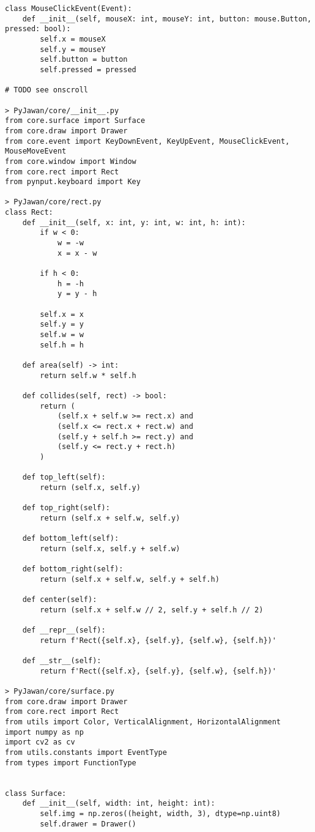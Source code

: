 \documentclass[11pt]{article}
\begin{document}
\begin{lstlisting}
class MouseClickEvent(Event):
    def __init__(self, mouseX: int, mouseY: int, button: mouse.Button, pressed: bool):
        self.x = mouseX
        self.y = mouseY
        self.button = button
        self.pressed = pressed

# TODO see onscroll

> PyJawan/core/__init__.py
from core.surface import Surface
from core.draw import Drawer
from core.event import KeyDownEvent, KeyUpEvent, MouseClickEvent, MouseMoveEvent
from core.window import Window
from core.rect import Rect
from pynput.keyboard import Key

> PyJawan/core/rect.py
class Rect:
    def __init__(self, x: int, y: int, w: int, h: int):
        if w < 0:
            w = -w
            x = x - w

        if h < 0:
            h = -h
            y = y - h

        self.x = x
        self.y = y
        self.w = w
        self.h = h

    def area(self) -> int:
        return self.w * self.h

    def collides(self, rect) -> bool:
        return (
            (self.x + self.w >= rect.x) and
            (self.x <= rect.x + rect.w) and
            (self.y + self.h >= rect.y) and
            (self.y <= rect.y + rect.h)
        )

    def top_left(self):
        return (self.x, self.y)

    def top_right(self):
        return (self.x + self.w, self.y)

    def bottom_left(self):
        return (self.x, self.y + self.w)

    def bottom_right(self):
        return (self.x + self.w, self.y + self.h)

    def center(self):
        return (self.x + self.w // 2, self.y + self.h // 2)

    def __repr__(self):
        return f'Rect({self.x}, {self.y}, {self.w}, {self.h})'

    def __str__(self):
        return f'Rect({self.x}, {self.y}, {self.w}, {self.h})'

> PyJawan/core/surface.py
from core.draw import Drawer
from core.rect import Rect
from utils import Color, VerticalAlignment, HorizontalAlignment
import numpy as np
import cv2 as cv
from utils.constants import EventType
from types import FunctionType


class Surface:
    def __init__(self, width: int, height: int):
        self.img = np.zeros((height, width, 3), dtype=np.uint8)
        self.drawer = Drawer()


\end{lstlisting}
\end{document}
